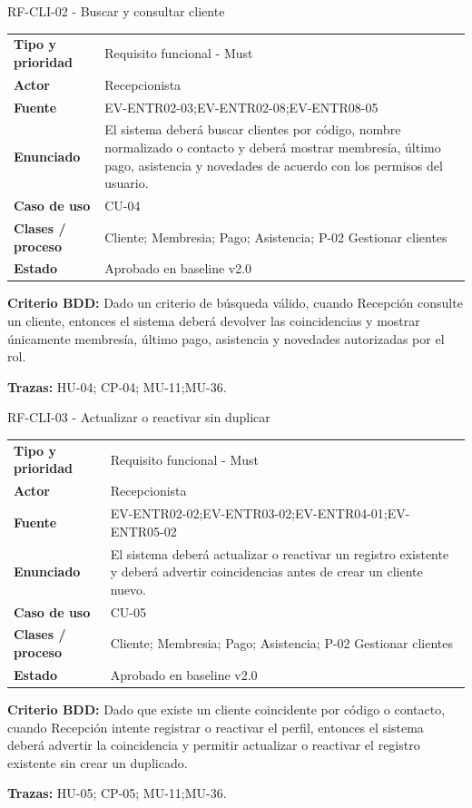 \begin{reqbox}{RF-CLI-02 - Buscar y consultar cliente}
\begin{tabularx}{\textwidth}{>{\bfseries}p{3.2cm}Y}
Tipo y prioridad & Requisito funcional - Must \\
Actor & Recepcionista \\
Fuente & EV-ENTR02-03;EV-ENTR02-08;EV-ENTR08-05 \\
Enunciado & El sistema deberá buscar clientes por código, nombre normalizado o contacto y deberá mostrar membresía, último pago, asistencia y novedades de acuerdo con los permisos del usuario. \\
Caso de uso & CU-04 \\
Clases / proceso & Cliente; Membresia; Pago; Asistencia; P-02 Gestionar clientes \\
Estado & Aprobado en baseline v2.0 \\
\end{tabularx}
\textbf{Criterio BDD:} Dado un criterio de búsqueda válido, cuando Recepción consulte un cliente, entonces el sistema deberá devolver las coincidencias y mostrar únicamente membresía, último pago, asistencia y novedades autorizadas por el rol.

\textbf{Trazas:} HU-04; CP-04; MU-11;MU-36.
\end{reqbox}


\begin{reqbox}{RF-CLI-03 - Actualizar o reactivar sin duplicar}
\begin{tabularx}{\textwidth}{>{\bfseries}p{3.2cm}Y}
Tipo y prioridad & Requisito funcional - Must \\
Actor & Recepcionista \\
Fuente & EV-ENTR02-02;EV-ENTR03-02;EV-ENTR04-01;EV-ENTR05-02 \\
Enunciado & El sistema deberá actualizar o reactivar un registro existente y deberá advertir coincidencias antes de crear un cliente nuevo. \\
Caso de uso & CU-05 \\
Clases / proceso & Cliente; Membresia; Pago; Asistencia; P-02 Gestionar clientes \\
Estado & Aprobado en baseline v2.0 \\
\end{tabularx}
\textbf{Criterio BDD:} Dado que existe un cliente coincidente por código o contacto, cuando Recepción intente registrar o reactivar el perfil, entonces el sistema deberá advertir la coincidencia y permitir actualizar o reactivar el registro existente sin crear un duplicado.

\textbf{Trazas:} HU-05; CP-05; MU-11;MU-36.
\end{reqbox}


